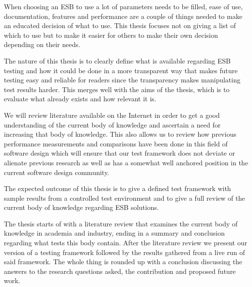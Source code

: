 When choosing an ESB to use a lot of parameters needs to be filled, ease of use, documentation, features and performance are a couple of things needed to make an educated decision of what to use. 
This thesis focuses not on giving a list of which to use but to make it easier for others to make their own decision depending on their needs.

The nature of this thesis is to clearly define what is available regarding ESB testing and how it could be done in a more transparent way that makes future testing easy and reliable for readers since the transparency makes manipulating test results harder. 
This merges well with the aims of the thesis, which is to evaluate what already exists and how relevant it is.

We will review literature available on the Internet in order to get a good understanding of the current body of knowledge and ascertain a need for increasing that body of knowledge. 
This also allows us to review how previous performance measurements and comparisons have been done in this field of software design which will ensure that our test framework does not deviate or alienate previous research as well as has a somewhat well anchored position in the current software design community.

The expected outcome of this thesis is to give a defined test framework with sample results from a controlled test environment and to give a full review of the current body of knowledge regarding ESB solutions.

The thesis starts of with a literature review that examines the current body of knowledge in academia and industry, ending in a summary and conclusion regarding what tests this body contain.
After the literature review we present our version of a testing framework followed by the results gathered from a live run of said framework.
The whole thing is rounded up with a conclusion discussing the answers to the research questions asked, the contribution and proposed future work.
